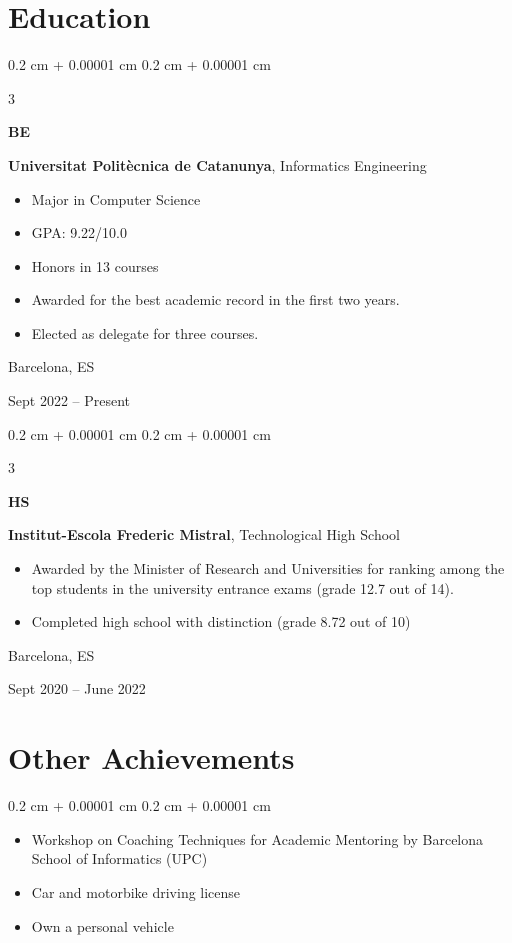 \documentclass[10pt, letterpaper]{article}
\newenvironment{highlights}{
    \begin{itemize}[
        topsep=0.10 cm,
        parsep=0.10 cm,
        partopsep=0pt,
        itemsep=0pt,
        leftmargin=0.4 cm + 10pt
    ]
}{
    \end{itemize}
} %
\newenvironment{highlightsforbulletentries}{
    \begin{itemize}[
        topsep=0.10 cm,
        parsep=0.10 cm,
        partopsep=0pt,
        itemsep=0pt,
        leftmargin=10pt
    ]
}{
    \end{itemize}
} %
\newenvironment{onecolentry}{
    \begin{adjustwidth}{
        0.2 cm + 0.00001 cm
    }{
        0.2 cm + 0.00001 cm
    }
}{
    \end{adjustwidth}
} %
\newenvironment{threecolentry}[3][]{
    \onecolentry
    \def\thirdColumn{#3}
    \setcolumnwidth{1 cm, \fill, 4.5 cm}
    \begin{paracol}{3}
    {\raggedright #2} \switchcolumn
}{
    \switchcolumn \raggedleft \thirdColumn
    \end{paracol}
    \endonecolentry
} %
\begin{document}
    \section{Education}
        \begin{threecolentry}{\textbf{BE}}{
            Barcelona, ES
            
            Sept 2022 – Present
        }
            \textbf{Universitat Politècnica de Catanunya}, Informatics Engineering
            \begin{highlights}
                \item Major in Computer Science
                \item GPA: 9.22/10.0
                \item Honors in 13 courses
                \item Awarded for the best academic record  in the first two years.
                \item Elected as delegate for three courses.
            \end{highlights}
        \end{threecolentry}

        \vspace{0.2 cm}

        \begin{threecolentry}{\textbf{HS}}{
            Barcelona, ES
            
            Sept 2020 – June 2022
        }
            \textbf{Institut-Escola Frederic Mistral}, Technological High School
            \begin{highlights}
                \item Awarded by the Minister of Research and Universities for ranking among the top students in the university entrance exams (grade 12.7 out of 14).
                \item Completed high school with distinction (grade 8.72 out of 10)
            \end{highlights}
        \end{threecolentry}
        
    
    \section{Other Achievements}
        \begin{onecolentry}
            \begin{highlightsforbulletentries}
                \item Workshop on Coaching Techniques for Academic Mentoring by Barcelona School of Informatics (UPC)
                \item Car and motorbike driving license
                \item Own a personal vehicle
            \end{highlightsforbulletentries}
        \end{onecolentry}
\end{document}
